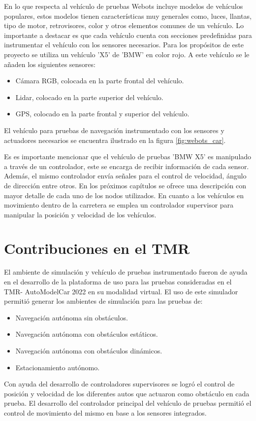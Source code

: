 En lo que respecta al vehículo de pruebas Webots incluye modelos de vehículos populares, estos modelos tienen características muy generales como, luces, llantas, tipo de motor, retrovisores, color y otros elementos comunes de un vehículo. Lo importante a destacar es que cada vehículo cuenta con secciones predefinidas para instrumentar el vehículo con los sensores necesarios. Para los propósitos de este proyecto se utiliza un vehículo 'X5' de 'BMW' en color rojo. A este vehículo se le añaden los siguientes sensores:
\begin{itemize}
    \item Cámara RGB, colocada en la parte frontal del vehículo.
    \item Lidar, colocado en la parte superior del vehículo.
    \item GPS, colocado en la parte frontal y superior del vehículo.
\end{itemize}

El vehículo para pruebas de navegación instrumentado con los sensores y actuadores necesarios se encuentra ilustrado en la figura \ref{fig:webots_car}.

Es es importante mencionar que el vehículo de pruebas 'BMW X5' es manipulado a través de un controlador, este se encarga de recibir información de cada sensor. Además, el mismo controlador envía señales para el control de velocidad, ángulo de dirección entre otros. En los próximos capítulos se ofrece una descripción con mayor detalle de cada uno de los nodos utilizados. En cuanto a los vehículos en movimiento dentro de la carretera se emplea un controlador supervisor para manipular la posición y velocidad de los vehículos.

\section{Contribuciones en el TMR} \label{sec:contribuciones_en_el_TMR}

El ambiente de simulación y vehículo de pruebas instrumentado fueron de ayuda en el desarrollo de la plataforma de uso para las pruebas consideradas en el TMR- AutoModelCar 2022 en su modalidad virtual. El uso de este simulador permitió generar los ambientes de simulación para las pruebas de:
\begin{itemize}
    \item Navegación autónoma sin obstáculos.
    \item Navegación autónoma con obstáculos estáticos.
    \item Navegación autónoma con obstáculos dinámicos.
    \item Estacionamiento autónomo.
\end{itemize}
Con ayuda del desarrollo de controladores supervisores se logró el control de posición y velocidad de los diferentes autos que actuaron como obstáculo en cada prueba. El desarrollo del controlador principal del vehículo de pruebas permitió el control de movimiento del mismo en base a los sensores integrados.
\\
\\

